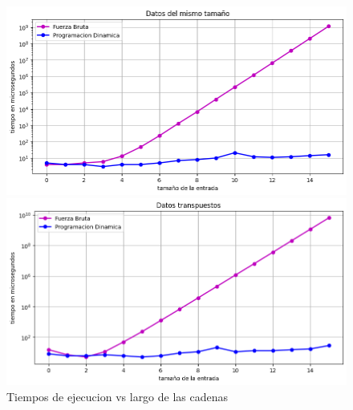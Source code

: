 \begin{figure}[H]
    \centering
    \begin{minipage}[t]{0.5\textwidth}
        \includegraphics[width=\textwidth]{images/mismotananio.png}
    \end{minipage}%
    \begin{minipage}[t]{0.5\textwidth}
        \includegraphics[width=\textwidth]{images/transpuesto.png}   \end{minipage}%
    \caption{Tiempos de ejecucion vs largo de las cadenas}
    \label{fig:Tiempos de ejecucion vs largo de las cadenas}
\end{figure}

